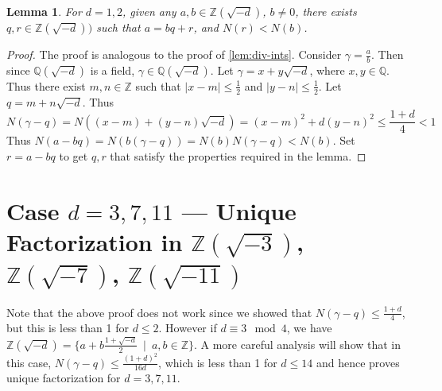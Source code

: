 \documentclass[12pt]{article}
\newcommand{\ints}{{\mathbb{Z}}}
\newcommand{\qf}{{\mathbb{Q}}}
\newtheorem{lemma}[thm]{Lemma}
\begin{document}
\begin{lemma}
For $d = 1, 2$, given any $a, b \in \ints(\sqrt{-d})$, $b \neq 0$, there exists $q, r \in \ints(\sqrt{-d}))$ such that $a = bq + r$, and $N(r) < N(b)$.
\end{lemma}
\begin{proof}
The proof is analogous to the proof of \cref{lem:div-ints}. Consider $\gamma = \frac{a}{b}$. Then since $\qf(\sqrt{-d})$ is a field, $\gamma \in \qf(\sqrt{-d})$. Let $\gamma = x + y\sqrt{-d}$, where $x, y \in \qf$. 
Thus there exist $m, n \in \ints$ such that $|x - m| \leq \frac{1}{2}$ and $|y - n| \leq \frac{1}{2}$. Let $q = m + n\sqrt{-d}$.  Thus
$$
N(\gamma - q) = N((x - m) + (y - n)\sqrt{-d}) = (x - m)^2 + d(y - n)^2 \leq \frac{1 + d}{4} < 1
$$
Thus $N(a - bq) = N(b(\gamma - q)) = N(b) N(\gamma - q) < N(b)$. Set $r = a - bq$ to get $q, r$ that satisfy the properties required in the lemma.
\end{proof}

\section{Case $d = 3, 7, 11$ --- Unique Factorization in $\ints(\sqrt{-3})$, $\ints(\sqrt{-7})$, $\ints(\sqrt{-11})$}

Note that the above proof does not work since we showed that $N(\gamma - q) \leq \frac{1 + d}{4}$, but this is less than 1 for $d \leq 2$.  However if $d \equiv 3 \mod 4$, we have $\ints(\sqrt{-d}) = \{a + b\frac{1 + \sqrt{-d}}{2}\ \mid\  a, b \in \ints\}$. A more careful analysis will show that in this case, $N(\gamma - q) \leq \frac{(1 + d)^2}{16d}$, which is less than 1 for $d \leq 14$ and hence proves unique factorization for $d = 3, 7, 11$.
\end{document}
